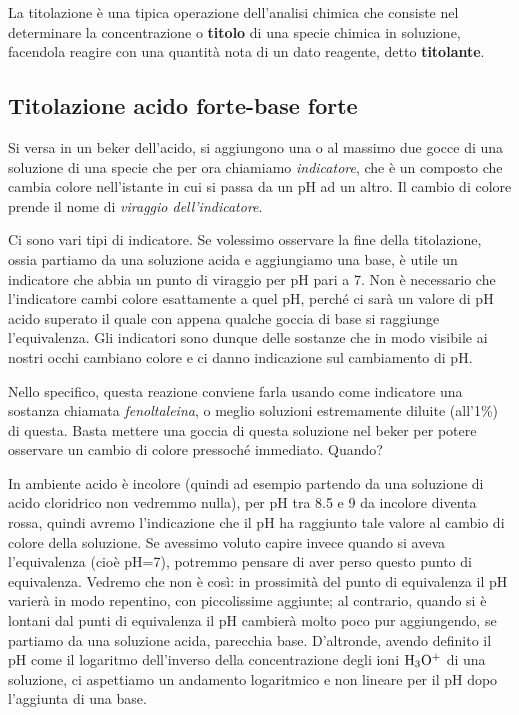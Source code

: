 La titolazione è una tipica operazione dell'analisi chimica che consiste nel determinare la concentrazione o \textbf{titolo} di una specie chimica in soluzione, facendola reagire con una quantità nota di un dato reagente, detto \textbf{titolante}.
\subsection{Titolazione acido forte-base forte}
Si versa in un beker dell'acido, si aggiungono una o al massimo due gocce di una soluzione di una specie che per ora chiamiamo \textit{indicatore}, che è un composto che cambia colore nell'istante in cui si passa da un pH ad un altro. Il cambio di colore prende il nome di \textit{viraggio dell'indicatore}.

Ci sono vari tipi di indicatore. Se volessimo osservare la fine della titolazione, ossia partiamo da una soluzione acida e aggiungiamo una base, è utile un indicatore che abbia un punto di viraggio per pH pari a 7. Non è necessario che l'indicatore cambi colore esattamente a quel pH, perché ci sarà un valore di pH acido superato il quale con appena qualche goccia di base si raggiunge l'equivalenza. Gli indicatori sono dunque delle sostanze che in modo visibile ai nostri occhi cambiano colore e ci danno indicazione sul cambiamento di pH.

Nello specifico, questa reazione conviene farla usando come indicatore una sostanza chiamata \textit{fenoltaleina}, o meglio soluzioni estremamente diluite (all'1\%) di questa. Basta mettere una goccia di questa soluzione nel beker per potere osservare un cambio di colore pressoché immediato. Quando?

In ambiente acido è incolore (quindi ad esempio partendo da una soluzione di acido cloridrico non vedremmo nulla), per pH tra 8.5 e 9 da incolore diventa rossa, quindi avremo l'indicazione che il pH ha raggiunto tale valore al cambio di colore della soluzione. Se avessimo voluto capire invece quando si aveva l'equivalenza (cioè pH=7), potremmo pensare di aver perso questo punto di equivalenza. Vedremo che non è così: in prossimità del punto di equivalenza il pH varierà in modo repentino, con piccolissime aggiunte; al contrario, quando si è lontani dal punti di equivalenza il pH cambierà molto poco pur aggiungendo, se partiamo da una soluzione acida, parecchia base. D'altronde, avendo definito il pH come il logaritmo dell'inverso della concentrazione degli ioni $\rm H_3O^+$ di una soluzione, ci aspettiamo un andamento logaritmico e non lineare per il pH dopo l'aggiunta di una base.

